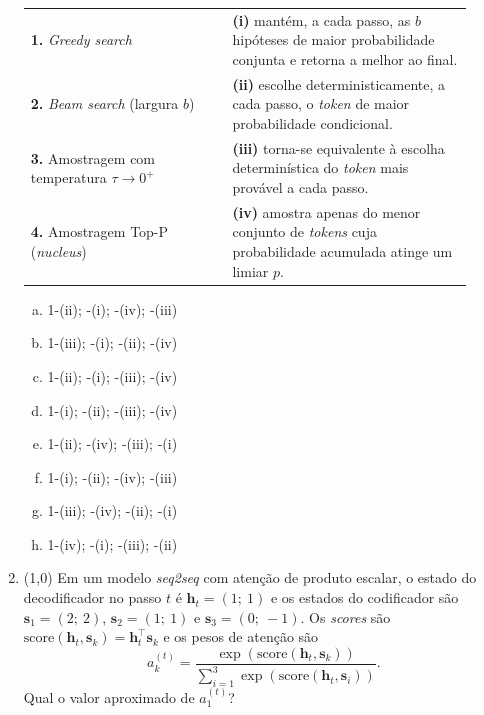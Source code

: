 \documentclass[11pt,a4paper]{article}
\begin{document}
\begin{enumerate}[1)]
\begin{center}
\begin{tabular}{p{0.42\linewidth} p{0.5\linewidth}}
\textbf{1.} \textit{Greedy search} & \textbf{(i)} mantém, a cada passo, as $b$ hipóteses de maior probabilidade conjunta e retorna a melhor ao final. \\
\textbf{2.} \textit{Beam search} (largura $b$) & \textbf{(ii)} escolhe deterministicamente, a cada passo, o \textit{token} de maior probabilidade condicional. \\
\textbf{3.} Amostragem com temperatura $\tau \to 0^{+}$ & \textbf{(iii)} torna-se equivalente à escolha determinística do \textit{token} mais provável a cada passo. \\
\textbf{4.} Amostragem Top-P (\textit{nucleus}) & \textbf{(iv)} amostra apenas do menor conjunto de \textit{tokens} cuja probabilidade acumulada atinge um limiar $p$. \\
\end{tabular}
\end{center}

\begin{enumerate}[a)]
    \item 1-(ii); -(i); -(iv); -(iii)
    \item 1-(iii); -(i); -(ii); -(iv)
    \item 1-(ii); -(i); -(iii); -(iv)
    \item 1-(i); -(ii); -(iii); -(iv)
    \item 1-(ii); -(iv); -(iii); -(i)
    \item 1-(i); -(ii); -(iv); -(iii)
    \item 1-(iii); -(iv); -(ii); -(i)
    \item 1-(iv); -(i); -(iii); -(ii)
\end{enumerate}

\item (1{,}0) Em um modelo \textit{seq2seq} com atenção de produto escalar, o estado do decodificador no passo $t$ é $\mathbf{h}_t = (1;\ 1)$ e os estados do codificador são $\mathbf{s}_1 = (2;\ 2)$, $\mathbf{s}_2 = (1;\ 1)$ e $\mathbf{s}_3 = (0;\ -1)$. Os \textit{scores} são $\mathrm{score}(\mathbf{h}_t, \mathbf{s}_k) = \mathbf{h}_t^{\top} \mathbf{s}_k$ e os pesos de atenção são
\[
a_k^{(t)} = \frac{\exp(\mathrm{score}(\mathbf{h}_t, \mathbf{s}_k))}{\sum_{i=1}^{3}\exp(\mathrm{score}(\mathbf{h}_t, \mathbf{s}_i))}.
\]
Qual o valor aproximado de $a_1^{(t)}$?


\end{enumerate}
\end{document}
